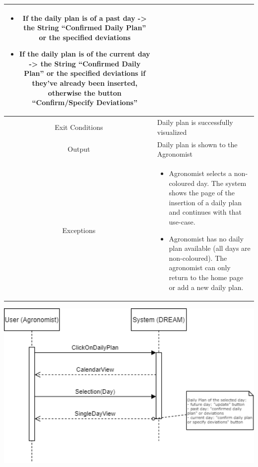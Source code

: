 \documentclass{article}
\begin{document}
\begin{center}
\begin{longtable}{|c| p{10cm}|}
\begin{itemize}
\begin{itemize}
                                            \item If the daily plan is of a past day -> the String “Confirmed Daily Plan” or the specified deviations 
                                            \item If the daily plan is of the current day -> the String “Confirmed Daily Plan” or the specified deviations if they’ve already been inserted, otherwise the button “Confirm/Specify Deviations”
                                        \end{itemize}
                            \end{itemize} \\
        \hline
            Exit Conditions & Daily plan is successfully visualized \\
        \hline
            Output & Daily plan is shown to the Agronomist\\
        \hline
            Exceptions & \begin{itemize}
                            \item Agronomist selects a non-coloured day. The system shows the page of the insertion of a daily plan and continues with that use-case.
                            \item Agronomist has no daily plan available (all days are non-coloured). The agronomist can only return to the home page or add a new daily plan.
                        \end{itemize}\\
        \hline
    \end{longtable}
    
    \newpage
    
    \includegraphics[width=1.0\textwidth]{images/sequenceDiagrams/15. AgronomistVisualizeDailyPlan.png}
    \par
    \caption{\label{fig:frog}Agronomist visualizes daily plan}


\end{center}
\end{document}
